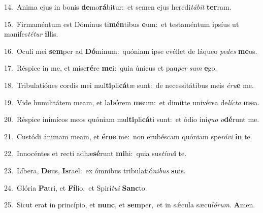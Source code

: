 {\numbfont\textcolor{\numbcolor}{14.}}~Anima ejus in bonis \textbf{de}\-mo\-\textbf{rá}\-bitur:~\star et semen ejus heredi\-\textit{tá}\-\textit{bit} \textbf{ter}\-ram.\par
{\numbfont\textcolor{\numbcolor}{15.}}~Firmaméntum est Dóminus ti\-\textbf{mén}\-tibus \textbf{e}\-um:~\star et testaméntum ipsíus ut manifes\-\textit{té}\-\textit{tur} \textbf{il}\-lis.\par
{\numbfont\textcolor{\numbcolor}{16.}}~Oculi mei \textbf{sem}\-per ad \textbf{Dó}\-minum:~\star quóniam ipse evéllet de láqueo \textit{pe}\-\textit{des} \textbf{me}\-os.\par
{\numbfont\textcolor{\numbcolor}{17.}}~Réspice in me, et mise\-\textbf{ré}\-re \textbf{me}\-i:~\star quia únicus et pau\textit{per} \textit{sum} \textbf{e}\-go.\par
{\numbfont\textcolor{\numbcolor}{18.}}~Tribulatiónes cordis mei mul\-\textbf{ti}\-pli\-\textbf{cá}\-tæ sunt:~\star de necessitátibus meis \textit{é}\-\textit{ru}\textbf{e} me.\par
{\numbfont\textcolor{\numbcolor}{19.}}~Vide humilitátem meam, et la\-\textbf{bó}\-rem \textbf{me}\-um:~\star et dimítte univérsa de\-\textit{líc}\-\textit{ta} \textbf{me}\-a.\par
{\numbfont\textcolor{\numbcolor}{20.}}~Réspice inimícos meos quóniam mul\-\textbf{ti}\-pli\-\textbf{cá}\-ti sunt:~\star et ódio iní\textit{quo} \textit{o}\-\textbf{dé}runt me.\par
{\numbfont\textcolor{\numbcolor}{21.}}~Custódi ánimam meam, et \textbf{é}\-ru\textbf{e} me:~\star non erubéscam quóniam spe\-\textit{rá}\-\textit{vi} \textbf{in} te.\par
{\numbfont\textcolor{\numbcolor}{22.}}~Innocéntes et recti adhæ\-\textbf{sé}\-runt \textbf{mi}\-hi:~\star quia sus\-\textit{tí}\-\textit{nu}\textbf{i} te.\par
{\numbfont\textcolor{\numbcolor}{23.}}~Líbera, \textbf{De}\-us, \textbf{Is}\-raël:~\star ex ómnibus tribulatió\-\textit{ni}\-\textit{bus} \textbf{su}\-is.\par
{\numbfont\textcolor{\numbcolor}{24.}}~Glória \textbf{Pa}\-tri, et \textbf{Fí}\-lio,~\star et Spirí\-\textit{tu}\-\textit{i} \textbf{Sanc}\-to.\par
{\numbfont\textcolor{\numbcolor}{25.}}~Sicut erat in princípio, et \textbf{nunc}\-, et \textbf{sem}\-per,~\star et in sǽcula sæcu\-\textit{ló}\-\textit{rum}. \textbf{A}\-men.\par
